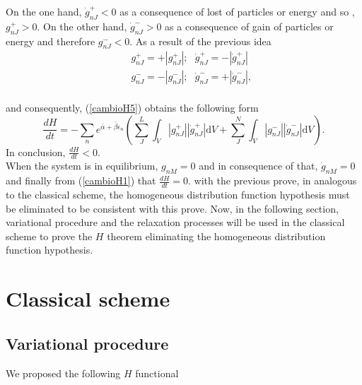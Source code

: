\documentclass{article}
\begin{document}
On the one hand, $\dot{g}^{+}_{nJ}<0$ as a consequence of lost of particles or energy and so , $g^{+}_{nJ}>0$. On the other hand, $\dot{g}^{-}_{nJ}>0$ as a consequence of gain of particles or energy and therefore $g^{-}_{nJ}<0$. As a result of the previous idea
\begin{eqnarray}
   &&g^{+}_{nJ}=+|g^{+}_{nJ}|; \ \ \  \dot{g}^{+}_{nJ}=-|\dot{g}^{+}_{nJ}| \nonumber \\
   &&g^{-}_{nJ}=-|g^{-}_{nJ}|; \ \ \ \dot{g}^{-}_{nJ}=+|\dot{g}^{-}_{nJ}| \label{separacion},
\end{eqnarray}{}
\\
and consequently, (\ref{cambioH5}) obtains the following form
\begin{equation}
    \frac{dH}{dt}=-\sum_n  e^{\bar{\alpha}+\bar{\beta}\epsilon_n}\left(\sum_J ^{L}\int_V |g^{+}_{nJ}||\dot{g}^{+}_{nJ}|\mathrm{d}V+\sum^{N}_J \int_V |g^{-}_{nJ}||\dot{g}^{-}_{nJ}|\mathrm{d}V \right). \label{cambioH6}
\end{equation}{}
In conclusion, $\frac{dH}{dt}<0$.\\
When the system is in equilibrium, $g_{nM}=0$ and in consequence of that, $\dot g_{nM}=0$ and finally from (\ref{cambioH1}) that $\frac{dH}{dt}=0$.
with the previous prove, in analogous to the classical scheme, the homogeneous distribution function hypothesis must be eliminated to be consistent with this prove. Now, in the following section, variational procedure and the relaxation processes will be used in the classical scheme to prove the $H$ theorem eliminating the homogeneous distribution function hypothesis.



\section{Classical scheme}
\subsection{Variational procedure}
We proposed the following $H$ functional
\end{document}
